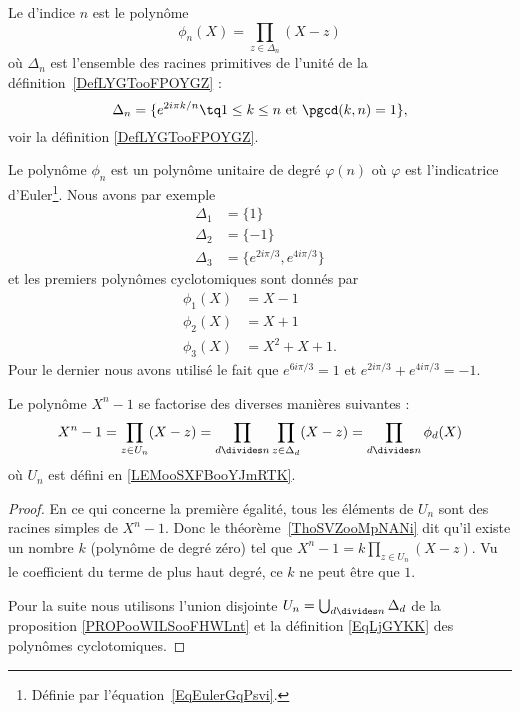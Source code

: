 \begin{definition}  \label{DefXGHooRAXlpp}
	Le  d'indice \( n\) est le polynôme
	\begin{equation}    \label{EqLjGYKK}
		\phi_n(X)=\prod_{z\in\Delta_n}(X-z)
	\end{equation}
	où \( \Delta_n\) est l'ensemble des racines primitives de l'unité de la définition~\ref{DefLYGTooFPOYGZ} :
	\begin{equation}
		\Delta_n=\{  e^{2i\pi k/n}\tq 1\leq k\leq n \text{ et } \pgcd(k,n)=1 \},
	\end{equation}
	voir la définition \ref{DefLYGTooFPOYGZ}.
\end{definition}

Le polynôme \( \phi_n\) est un polynôme unitaire de degré \( \varphi(n)\) où \( \varphi\) est l'indicatrice d'Euler\footnote{Définie par l'équation~\ref{EqEulerGqPsvi}.}. Nous avons par exemple
\begin{subequations}
	\begin{align}
		\Delta_1 & =\{  1 \}                          \\
		\Delta_2 & =\{ -1 \}                          \\
		\Delta_3 & =\{  e^{2i\pi /3}, e^{4i\pi /3} \}
	\end{align}
\end{subequations}
et les premiers polynômes cyclotomiques sont donnés par
\begin{subequations}
	\begin{align}
		\phi_1(X) & =X-1      \\
		\phi_2(X) & =X+1      \\
		\phi_3(X) & =X^2+X+1.
	\end{align}
\end{subequations}
Pour le dernier nous avons utilisé le fait que \( e^{6i\pi /3}=1\) et \( e^{2i\pi /3} + e^{4i\pi /3}=-1\).

\begin{lemma}   \label{LemKYGBooAwpOHD}
	Le polynôme \( X^n-1\) se factorise des diverses manières suivantes :
	\begin{equation}
		X^n-1=\prod_{z\in U_n}(X-z)=\prod_{d\divides n}\prod_{z\in \Delta_d}(X-z)=\prod_{d\divides n}\phi_d(X)
	\end{equation}
	où \( U_n\) est défini en \ref{LEMooSXFBooYJmRTK}.
\end{lemma}

\begin{proof}
	En ce qui concerne la première égalité, tous les éléments de \( U_n\) sont des racines simples de \( X^n-1\). Donc le théorème~\ref{ThoSVZooMpNANi} dit qu'il existe un nombre \( k\) (polynôme de degré zéro) tel que \( X^n-1=k\prod_{z\in U_n}(X-z)\). Vu le coefficient du terme de plus haut degré, ce \( k\) ne peut être que \( 1\).

	Pour la suite nous utilisons l'union disjointe \( U_n=\bigcup_{d\divides n}\Delta_d\) de la proposition \ref{PROPooWILSooFHWLnt} et la définition \eqref{EqLjGYKK} des polynômes cyclotomiques.
\end{proof}


